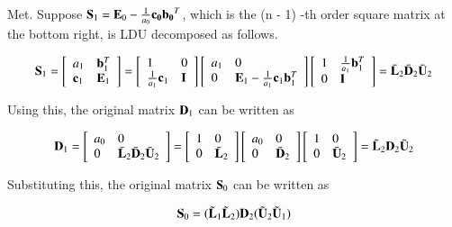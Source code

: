 Met. Suppose $\mathbf{S}_1 =\mathbf{E}_0 - \frac{1}{a_0}\mathbf{c_0}\mathbf{b_0}^T$, which is the (n - 1) -th order square matrix at the bottom right, is LDU decomposed as follows.

\begin{eqnarray}
\mathbf{S}_1=\left[\begin{array}{ll}
a_1 & \mathbf{b}^T_1\\ \mathbf{c}_1 & \mathbf{E}_1\end{array}\right]
=
\left[\begin{array}{ll}1 & 0\\ \frac{1}{a_1}\mathbf{c}_1 & \mathbf{I}\end{array}\right]
\left[\begin{array}{ll}a_1 & 0\\ 0 & \mathbf{E}_1 - \frac{1}{a_1}\mathbf{c}_1\mathbf{b}_1^T\end{array}\right]
\left[\begin{array}{ll}1 & \frac{1}{a_1}\mathbf{b}_1^T\\ 0 & \mathbf{I}\end{array}\right]
= \bar{\mathbf{L}}_2 \bar{\mathbf{D}}_2 \bar{\mathbf{U}}_2
\end{eqnarray}

Using this, the original matrix $\mathbf{D}_1$ can be written as

\begin{eqnarray}
\mathbf{D}_1 =
\left[\begin{array}{ll}a_0 & 0\\ 0 & \bar{\mathbf{L}}_2\bar{\mathbf{D}}_2\bar{\mathbf{U}}_2\end{array}\right] =
\left[\begin{array}{ll}1 & 0\\ 0 & \bar{\mathbf{L}}_2\end{array}\right]
\left[\begin{array}{ll}a_0 & 0\\ 0 & \bar{\mathbf{D}}_2\end{array}\right]
\left[\begin{array}{ll}1 & 0\\ 0 & \bar{\mathbf{U}}_2\end{array}\right] = \tilde{\mathbf{L}}_2\mathbf{D}_2\tilde{\mathbf{U}}_2
\end{eqnarray}

Substituting this, the original matrix $\mathbf{S}_0$ can be written as

\begin{equation}
\mathbf{S}_0 = (\tilde{\mathbf{L}}_1 \tilde{\mathbf{L}}_2) \mathbf{D}_2 (\tilde{\mathbf{U}}_2 \tilde{\mathbf{U}}_1)
\end{equation}

